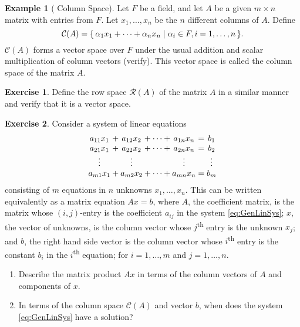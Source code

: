 \documentclass[svgnames]{article}
\theoremstyle{definition}
\newtheorem{Example}[Theorem]{Example}
\newtheorem{Exercise}{Exercise}[section]
\theoremstyle{remark}
\newcommand{\newterm}[1]{{\color{alertcolor} #1}}
\renewcommand{\th}{\textsuperscript{th}\xspace}
\begin{document}
\begin{Example}[\newterm{Column Space}]\label{ex:ColSpace}
Let $F$ be a field, and let $A$ be a given $m \times n$ matrix with entries from $F$. Let $x_1, \ldots, x_n$ be the $n$ different columns of $A$. Define
\begin{equation*}
	\mathcal C(A) = \qty{\, \alpha_1 x_1 + \cdots + \alpha_n x_n \mid \alpha_i \in F, i = 1, \ldots, n \,}.
\end{equation*}
$\mathcal C(A)$ forms a vector space over $F$ under the usual addition and scalar multiplication of column vectors (verify). This vector space is called the \newterm{column space} of the matrix $A$.
\end{Example}
\begin{Exercise}\label{exer:RowSpace}
Define the \newterm{row space} $\mathcal R(A)$ of the matrix $A$ in a similar manner and verify that it is a vector space.
\end{Exercise}

\begin{Exercise}
Consider a system of linear equations
\begin{align}
\begin{array}{@{}*{7}{c@{}}}
	a_{11} x_1 & {}+{} & a_{12} x_2 & {}+ \cdots +{} & a_{1n} x_n & {}={} & b_1\\
	a_{21} x_1 & {}+{} & a_{22} x_2 & {}+ \cdots +{} & a_{2n} x_n & {}={} & b_2\\
	\vdots     &       & \vdots     &                & \vdots     &       & \vdots\\
	a_{m1} x_1 & {}+{} & a_{m2} x_2 & {}+ \cdots +{} & a_{mn} x_n & {}={} & b_m
\end{array} \label{eq:GenLinSys}
\end{align}
consisting of $m$ equations in $n$ unknowns $x_1, \ldots, x_n$. This can be written equivalently as a matrix equation $Ax = b$, where $A$, the \newterm{coefficient matrix}, is the matrix whose $(i,j)$-entry is the coefficient $a_{ij}$ in the system \eqref{eq:GenLinSys}; $x$, the \newterm{vector of unknowns}, is the column vector whose $j$\th entry is the unknown $x_j$; and $b$, the \newterm{right hand side vector} is the column vector whose $i$\th entry is the constant $b_i$ in the $i$\th equation; for $i = 1, \ldots, m$ and $j = 1, \ldots, n$.
\begin{enumerate}
\item Describe the matrix product $Ax$ in terms of the column vectors of $A$ and components of $x$.
\item In terms of the column space $\mathcal{C}(A)$ and vector $b$, when does the system \eqref{eq:GenLinSys} have a solution?
\end{enumerate}
\end{Exercise}

%
\end{document}
